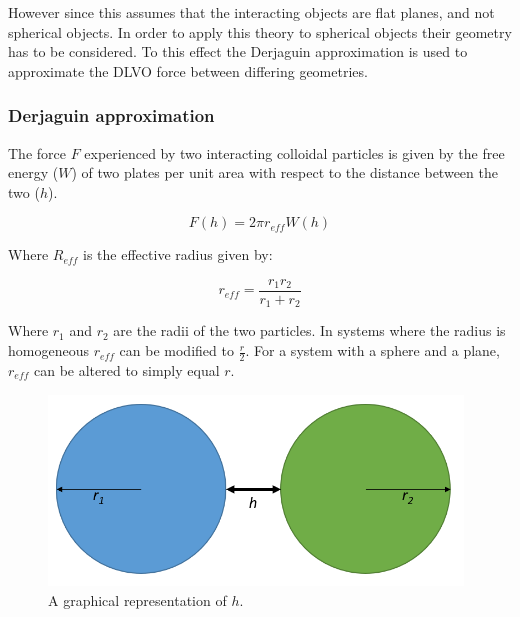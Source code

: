 However since this assumes that the interacting objects are flat planes, and not spherical objects. In order to apply this theory to spherical objects their geometry has to be considered. To this effect the Derjaguin approximation is used to approximate the DLVO force between differing geometries.

\subsubsection{Derjaguin approximation}

The force $F$ experienced by two interacting colloidal particles is given by the free energy ($W$) of two plates  per unit area with respect to the distance between the two ($h$). 

\begin{equation} %
F(h) = 2 \pi r_{eff} W(h)
\end{equation}

Where $R_{eff}$ is the effective radius given by:

\begin{equation} %
r_{eff} = \frac{r_1r_2}{r_1 + r_2}
\end{equation}

Where $r_1$ and $r_2$ are the radii of the two particles. In systems where the radius is homogeneous $r_{eff}$ can be modified to $\frac{r}{2}$. For a system with a sphere and a plane, $r_{eff}$ can be altered to simply equal $r$.

\begin{figure}[h]     %
        \begin{center}
          \includegraphics[width=110mm]{chapter1/h_graph.PNG}
\end{center}
\caption{A graphical representation of $h$.}
\label{fig:h_graph}                 %
\end{figure}

